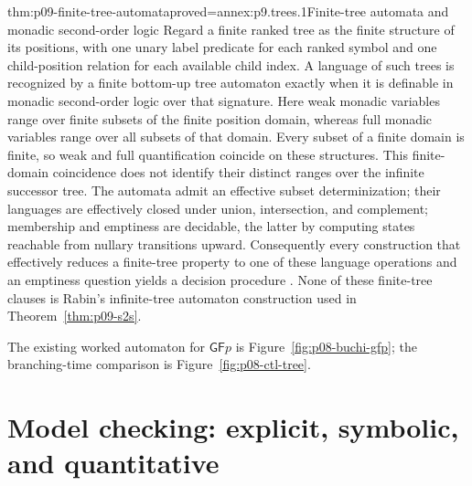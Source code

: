 \begin{hbtheorem}{thm:p09-finite-tree-automata}{proved=annex:p9.trees.1}{Finite-tree automata and monadic second-order logic}
Regard a finite ranked tree as the finite structure of its positions, with one
unary label predicate for each ranked symbol and one child-position relation
for each available child index.  A language of such trees is recognized by a
finite bottom-up tree automaton exactly when it is definable in monadic
second-order logic over that signature.  Here weak monadic variables range over
finite subsets of the finite position domain, whereas full monadic variables
range over all subsets of that domain.  Every subset of a finite domain is
finite, so weak and full quantification coincide on these structures.  This
finite-domain coincidence does not identify their distinct ranges over the
infinite successor tree.
The automata admit an effective subset determinization; their languages are
effectively closed under union, intersection, and complement; membership and
emptiness are decidable, the latter by computing states reachable from nullary
transitions upward.  Consequently every construction that effectively
reduces a finite-tree property to one of these language operations and an
emptiness question yields a decision procedure
\cite{ComonEtAl2007}.  None of these finite-tree clauses is Rabin's
infinite-tree automaton construction used in Theorem~\ref{thm:p09-s2s}.
\end{hbtheorem}

The existing worked automaton for \(\mathsf G\mathsf Fp\) is
Figure~\ref{fig:p08-buchi-gfp}; the branching-time comparison is
Figure~\ref{fig:p08-ctl-tree}.






\section{Model checking: explicit, symbolic, and quantitative}
\label{sec:p09-model-checking}

